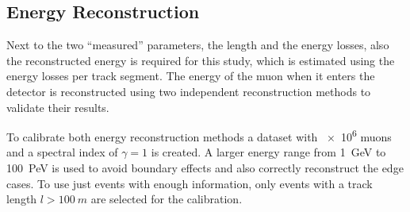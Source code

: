 %

\subsection{Energy Reconstruction} \label{sec:study_ereco}

Next to the two \enquote{measured} parameters, the length and the energy losses, also the reconstructed energy is required for this study, which is estimated using the energy losses per track segment.
The energy of the muon when it enters the detector is reconstructed using two independent reconstruction methods to validate their results.

To calibrate both energy reconstruction methods a dataset with \num{e6} muons and a spectral index of $\gamma=1$ is created.
A larger energy range from \SI{1}{GeV} to \SI{100}{PeV} is used to avoid boundary effects and also correctly reconstruct the edge cases.
To use just events with enough information, only events with a track length $l > \SI{100}{m}$ are selected for the calibration.

